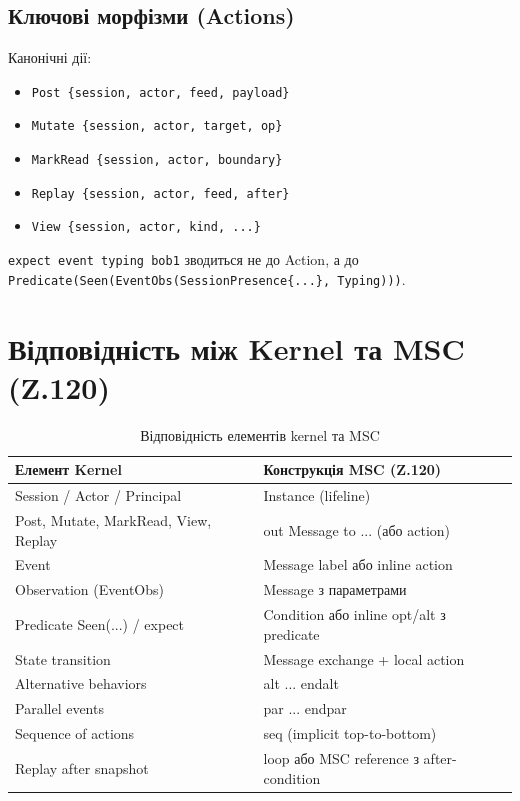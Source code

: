 \documentclass{article}
\begin{document}
\subsection{Ключові морфізми (Actions)}
Канонічні дії:
\begin{itemize}
    \item \texttt{Post \{session, actor, feed, payload\}}
    \item \texttt{Mutate \{session, actor, target, op\}}
    \item \texttt{MarkRead \{session, actor, boundary\}}
    \item \texttt{Replay \{session, actor, feed, after\}}
    \item \texttt{View \{session, actor, kind, ...\}}
\end{itemize}

\texttt{expect event typing bob1} зводиться не до Action, а до \texttt{Predicate(Seen(EventObs(SessionPresence\{...\}, Typing)))}.

\section{Відповідність між Kernel та MSC (Z.120)}

\begin{table}[h]
\centering
\begin{tabular}{|l|l|}
\hline
\textbf{Елемент Kernel} & \textbf{Конструкція MSC (Z.120)} \\
\hline
Session / Actor / Principal & Instance (lifeline) \\
Post, Mutate, MarkRead, View, Replay & out Message to ... (або action) \\
Event & Message label або inline action \\
Observation (EventObs) & Message з параметрами \\
Predicate Seen(...) / expect & Condition або inline opt/alt з predicate \\
State transition & Message exchange + local action \\
Alternative behaviors & alt ... endalt \\
Parallel events & par ... endpar \\
Sequence of actions & seq (implicit top-to-bottom) \\
Replay after snapshot & loop або MSC reference з after-condition \\
\hline
\end{tabular}
\caption{Відповідність елементів kernel та MSC}
\end{table}
\end{document}
